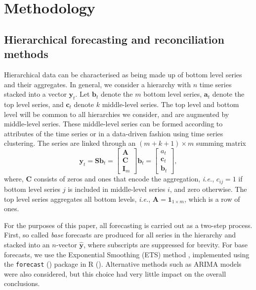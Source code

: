 \documentclass[a4paper,review,12pt,authoryear]{elsarticle}
\let\code=\texttt
\begin{document}
\section{Methodology}\label{sec:methodology}

\subsection{Hierarchical forecasting and reconciliation methods}


Hierarchical data can be characterised as being made up of bottom level series and their aggregates. In general, we consider a hierarchy with $n$ time series stacked into a vector $\boldsymbol{y}_t$. Let $\boldsymbol{b}_t$ denote the $m$ bottom level series, $\boldsymbol{a}_t$ denote the top level series, and $\boldsymbol{c}_t$ denote $k$ middle-level series. The top level and bottom level will be common to all hierarchies we consider, and are augmented by middle-level series. These middle-level series can be formed according to attributes of the time series or in a data-driven fashion using time series clustering. The series are linked through an $(m+k+1)\times m$ summing matrix 
\[
  \boldsymbol{y}_t = \boldsymbol{S}\boldsymbol{b}_t = \begin{bmatrix}
    \boldsymbol{A} \\\boldsymbol{C} \\ \boldsymbol{I}_m 
  \end{bmatrix}  \boldsymbol{b}_t = \begin{bmatrix}
      {a_t} \\ \boldsymbol{c}_t \\\boldsymbol{b}_t
  \end{bmatrix},
\]
where, $\boldsymbol{C}$ consists of zeros and ones that encode the aggregation, \textit{i.e.}, $c_{ij}=1$ if bottom level series $j$ is included in middle-level series $i$, and zero otherwise. The top level series aggregates all bottom levels, \textit{i.e.}, $\boldsymbol{A} = \mathbf{1}_{1\times m}$, which is a row of ones.



For the purposes of this paper, all forecasting is carried out as a two-step process. First, so called \textit{base} forecasts are produced for all series in the hierarchy and stacked into an $n$-vector $\hat{\bm{y}}$, where subscripts are suppressed for brevity. For base forecasts, we use the Exponential Smoothing (ETS) method \citep{ForecastingExponentialSmoothing}, implemented using the \code{forecast} (\citealp{forecast}) package in {R} (\citealp{R}). Alternative methods such as ARIMA models were also considered, but this choice had very little impact on the overall conclusions. 
\end{document}

